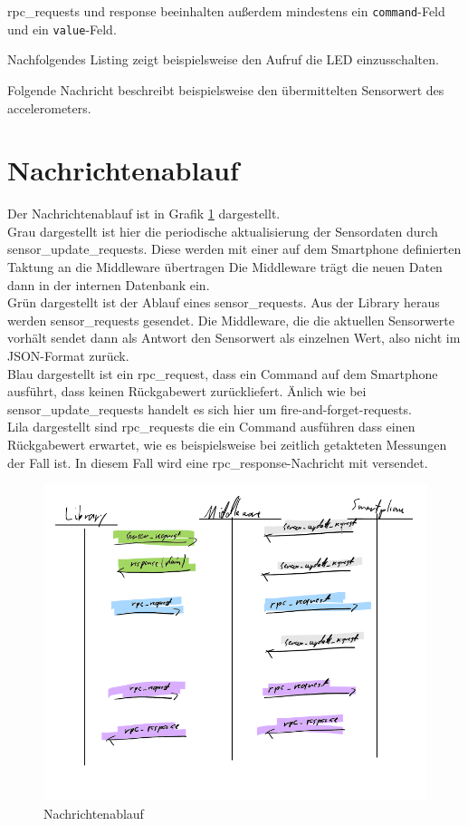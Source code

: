 \documentclass[11pt,a4paper]{report}
\begin{document}
rpc\_requests und response beeinhalten außerdem mindestens ein \texttt{command}-Feld und ein \texttt{value}-Feld.

Nachfolgendes Listing zeigt beispielsweise den Aufruf die LED einzusschalten.


Folgende Nachricht beschreibt beispielsweise den übermittelten Sensorwert des accelerometers.


\section*{Nachrichtenablauf}

Der Nachrichtenablauf ist in Grafik \ref*{fig:message flow} dargestellt.
\\
Grau dargestellt ist hier die periodische aktualisierung der Sensordaten durch sensor\_update\_requests.
Diese werden mit einer auf dem Smartphone definierten Taktung an die Middleware übertragen
Die Middleware trägt die neuen Daten dann in der internen Datenbank ein.
\\
Grün dargestellt ist der Ablauf eines sensor\_requests.
Aus der Library heraus werden sensor\_requests gesendet.
Die Middleware, die die aktuellen Sensorwerte vorhält sendet dann als Antwort den Sensorwert als einzelnen Wert, also nicht im JSON-Format zurück.
\\
Blau dargestellt ist ein rpc\_request, dass ein Command auf dem Smartphone ausführt, dass keinen Rückgabewert zurückliefert. Änlich wie bei sensor\_update\_requests handelt es sich hier um fire-and-forget-requests.
\\
Lila dargestellt sind rpc\_requests die ein Command ausführen dass einen Rückgabewert erwartet, wie es beispielsweise bei zeitlich getakteten Messungen der Fall ist. 
In diesem Fall wird eine rpc\_response-Nachricht mit versendet.

\begin{figure}[htbp]
  \centering
  \includegraphics[width=.9\textwidth]{images/message_flow.png}
  \caption{Nachrichtenablauf}
  \label{fig:message flow}
\end{figure}
\end{document}
